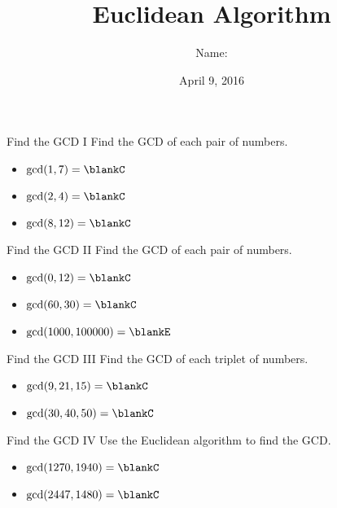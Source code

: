 \documentclass[12pt,letterpaper]{article}
\title{Euclidean Algorithm}
\author{Name: \underline{\hspace{5cm}}}
\date{April 9, 2016}
\begin{document}
\maketitle

\thispagestyle{empty}

\begin{problem}{Find the GCD I}
 Find the GCD of each pair of numbers.

 \begin{itemize}
  \item $\gcd(1, 7) = \blankC$
  \item $\gcd(2, 4) = \blankC$
  \item $\gcd(8, 12) = \blankC$
 \end{itemize}
\end{problem}

\begin{problem}{Find the GCD II}
 Find the GCD of each pair of numbers.

 \begin{itemize}
  \item $\gcd(0, 12) = \blankC$
  \item $\gcd(60, 30) = \blankC$
  \item $\gcd(1000, 100000) = \blankE$
 \end{itemize}
\end{problem}

\begin{problem}{Find the GCD III}
 Find the GCD of each triplet of numbers.

 \begin{itemize}
  \item $\gcd(9, 21, 15) = \blankC$
  \item $\gcd(30, 40, 50) = \blankC$
 \end{itemize}
\end{problem}

\begin{problem}{Find the GCD IV}
 Use the Euclidean algorithm to find the GCD.

 \begin{itemize}
  \item $\gcd(1270, 1940) = \blankC$
  \item $\gcd(2447, 1480) = \blankC$
 \end{itemize}
\end{problem}
\end{document}
